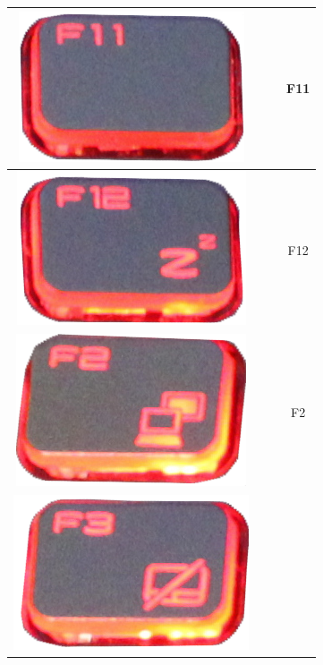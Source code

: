 \begin{longtable}{cccc}
\begin{minipage}[c]{.3\textwidth}
\vspace{0.2cm}
\includegraphics[scale=0.1]{Images/KeyMapping/F11}
\vspace{0.2cm}
\end{minipage} & & & F11\\
\hline
\begin{minipage}[c]{.3\textwidth}
\vspace{0.2cm}
\includegraphics[scale=0.1]{Images/KeyMapping/F12}
\vspace{0.2cm}
\end{minipage} & & & F12\\
\hline
\begin{minipage}[c]{.3\textwidth}
\vspace{0.2cm}
\includegraphics[scale=0.1]{Images/KeyMapping/F2}
\vspace{0.2cm}
\end{minipage} & & & F2\\
\hline
\begin{minipage}[c]{.3\textwidth}
\vspace{0.2cm}
\includegraphics[scale=0.1]{Images/KeyMapping/F3}

\end{minipage}
\end{longtable}
